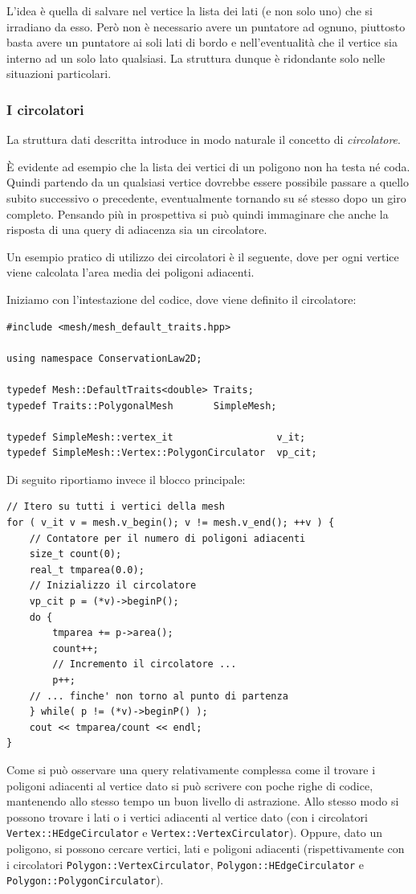 L'idea è quella di salvare nel vertice la lista dei lati (e non solo uno) che si irradiano da esso. Però non è necessario avere un puntatore ad ognuno, piuttosto basta avere un puntatore ai soli lati di bordo e nell'eventualità che il vertice sia interno ad un solo lato qualsiasi.
La struttura dunque è ridondante solo nelle situazioni particolari.

\subsubsection{I circolatori}
La struttura dati descritta introduce in modo naturale il concetto di \emph{circolatore}.

È evidente ad esempio che la lista dei vertici di un poligono non ha testa né coda. Quindi partendo da un qualsiasi vertice dovrebbe essere possibile passare a quello subito successivo o precedente, eventualmente tornando su sé stesso dopo un giro completo. Pensando più in prospettiva si può quindi immaginare che anche la risposta di una query di adiacenza sia un circolatore.

Un esempio pratico di utilizzo dei circolatori è il seguente, dove per ogni vertice viene calcolata l'area media dei poligoni adiacenti.

Iniziamo con l'intestazione del codice, dove viene definito il circolatore:
\begin{lstlisting}[name=esempioCirc]
#include <mesh/mesh_default_traits.hpp>

using namespace ConservationLaw2D;

typedef Mesh::DefaultTraits<double> Traits;
typedef Traits::PolygonalMesh       SimpleMesh;

typedef SimpleMesh::vertex_it                  v_it;
typedef SimpleMesh::Vertex::PolygonCirculator  vp_cit;
\end{lstlisting}
Di seguito riportiamo invece il blocco principale:
\begin{lstlisting}[name=esempioCirc]
// Itero su tutti i vertici della mesh
for ( v_it v = mesh.v_begin(); v != mesh.v_end(); ++v ) {
    // Contatore per il numero di poligoni adiacenti
    size_t count(0);
    real_t tmparea(0.0);
    // Inizializzo il circolatore
    vp_cit p = (*v)->beginP();
    do {
        tmparea += p->area();
        count++;
        // Incremento il circolatore ...
        p++;
    // ... finche' non torno al punto di partenza
    } while( p != (*v)->beginP() );
    cout << tmparea/count << endl;
}
\end{lstlisting}
Come si può osservare una query relativamente complessa come il trovare i poligoni adiacenti al vertice dato si può scrivere con poche righe di codice, mantenendo allo stesso tempo un buon livello di astrazione. Allo stesso modo si possono trovare i lati o i vertici adiacenti al vertice dato (con i circolatori \texttt{Vertex::HEdgeCirculator} e \texttt{Vertex::VertexCirculator}). Oppure, dato un poligono, si possono cercare vertici, lati e poligoni adiacenti (rispettivamente con i circolatori \texttt{Polygon::VertexCirculator}, \texttt{Polygon::HEdgeCirculator} e \texttt{Polygon::PolygonCirculator}).

